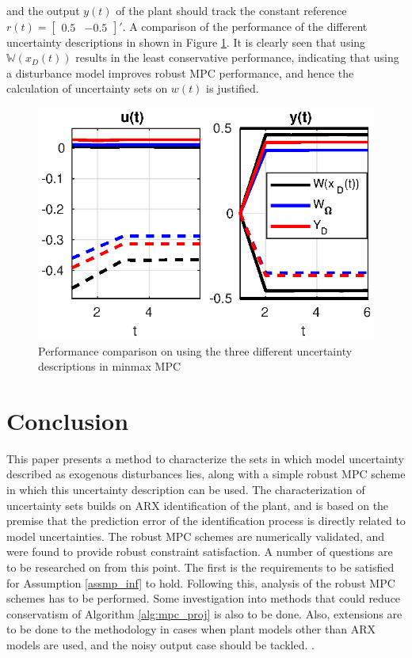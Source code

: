 \documentclass[letterpaper, 10 pt, conference]{ieeeconf}  %
\begin{document}
and the output $y(t)$ of the plant should track the constant reference $r(t)=\begin{bmatrix} 0.5 & -0.5 \end{bmatrix} '$. A comparison of the performance of the different uncertainty descriptions in shown in Figure \ref{minmaxMPC}. It is clearly seen that using $\mathbb{W}(x_D(t))$ results in the least conservative performance, indicating that using a disturbance model improves robust MPC performance, and hence the calculation of uncertainty sets on $w(t)$ is justified.
\begin{figure}[h]
	\centering
\includegraphics[scale=0.6]{mimax_full.eps}
\caption{Performance comparison on using the three different uncertainty descriptions in minmax MPC}
\label{minmaxMPC}
\end{figure}
\section{Conclusion}
This paper presents a method to characterize the sets in which model uncertainty described as exogenous disturbances lies, along with a simple robust MPC scheme in which this uncertainty description can be used. The characterization of uncertainty sets builds on ARX identification of the plant, and is based on the premise that the prediction error of the identification process is directly related to model uncertainties. The robust MPC schemes are numerically validated, and were found to provide robust constraint satisfaction. 
A number of questions are to be researched on from this point. The first is the requirements to be satisfied for Assumption \ref{assmp_inf} to hold. Following this, analysis of the robust MPC schemes has to be performed. Some investigation into methods that could reduce conservatism of Algorithm \ref{alg:mpc_proj} is also to be done. Also, extensions are to be done to the methodology in cases when plant models other than ARX models are used, and the noisy output case should be tackled.
. 
\end{document}
